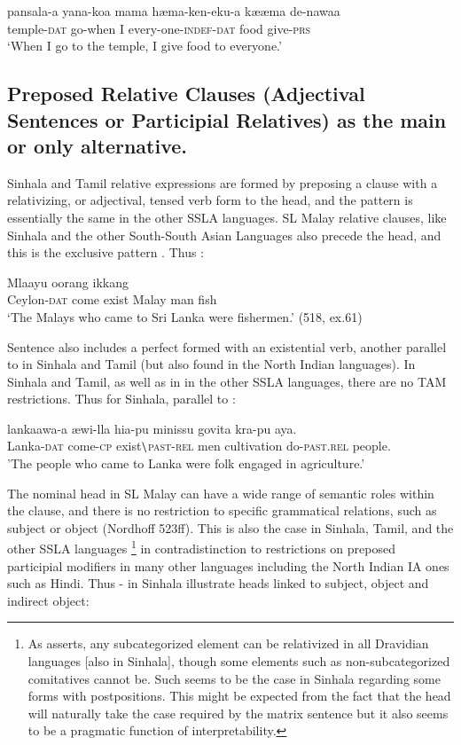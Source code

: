 \ea\label{ex3.2.4} 
\gll  pansala-{\dott}a  yana-ko{\dott}a  mama  h{\ae}ma-ken-eku-{\dott}a  k{\ae}{\ae}ma de-nawaa\\
  temple-\textsc{dat} go-when I every-one-\textsc{indef}-\textsc{dat} food give-\textsc{prs}\\
  `When I go to the temple, I give food to everyone.'
\z

\subsection{Preposed Relative Clauses (Adjectival Sentences or Participial Relatives) as the main or only alternative. }\label{gair:sec:3.3}

Sinhala and Tamil relative expressions are formed by preposing a clause with a relativizing, or adjectival, tensed verb form to the head, and the pattern is essentially the same in the other SSLA languages. 
SL Malay relative clauses, like Sinhala and the other South-South Asian Languages also precede the head, and this is the exclusive pattern \citep[370]{Nordhoff2009}. Thus  :


\ea\label{ex3.3.1} 
\gll  [Seelong=nang dhaataang aada {\O}] Mlaayu oorang ikkang\\
 Ceylon-\textsc{dat}  come exist  {} Malay  man  fish \\
 `The Malays who came to Sri Lanka were fishermen.'  (518, ex.61)
\z


Sentence  also includes a perfect formed with an existential verb, another parallel to in Sinhala and Tamil (but also found in the North Indian languages). In Sinhala and Tamil, as well as in in the other SSLA languages, there are no TAM restrictions. Thus for Sinhala, parallel to : 


\ea\label{ex3.3.2} 
\gll  lankaawa-{\dott}a {\ae}wi-lla hi{\dott}a-pu  minissu govita{\ng} k{\E}ra-pu aya.\\
 Lanka-\textsc{dat} come-\textsc{cp} exist$\backslash$\textsc{past}-\textsc{rel}  men cultivation do-\textsc{past.rel}  people.  \\
'The people who came to Lanka were folk engaged in agriculture.'
\z

The nominal head in SL Malay can have a wide range of semantic roles within the clause, and there is no restriction to specific grammatical relations, such as subject or object (Nordhoff 523ff). This is also the case in Sinhala, Tamil, and the other SSLA languages \citep[Section 9.1.2)]{Subbaraoinpress}\footnote{As
  \citep[section 9.5.1.2]{Subbaraoinpress} asserts, any subcategorized element can be relativized in all Dravidian languages [also in Sinhala], though some elements such as non-subcategorized comitatives cannot be.  Such seems to be the case in Sinhala regarding some forms with postpositions. This might be expected from the fact that the head will naturally take the case required by the matrix sentence but it also seems to be a pragmatic function of interpretability. 
} 
in contradistinction to restrictions on preposed participial modifiers in many other languages including the North Indian IA ones such as Hindi. Thus - in Sinhala illustrate heads linked to subject, object and indirect object: 


